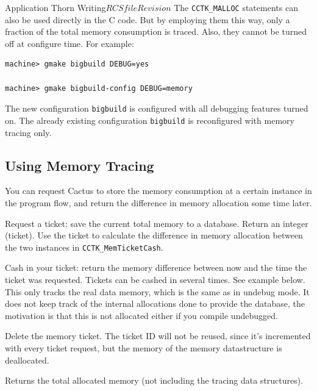 \begin{cactuspart}{Application Thorn Writing}{$RCSfile$}{$Revision$}
The \texttt{CCTK\_MALLOC} statements can also be used directly in the C
code. But by employing them this way, only a fraction of the total
memory consumption is traced. Also, they cannot be turned off at
configure time. For example:
\begin{verbatim}
machine> gmake bigbuild DEBUG=yes

machine> gmake bigbuild-config DEBUG=memory
\end{verbatim}
The new configuration \texttt{bigbuild} is configured with all debugging
features turned on. The already existing configuration \texttt{bigbuild}
is reconfigured with memory tracing only.

\subsection{Using Memory Tracing}
\label{sec:usmetr}

You can  request Cactus to store the memory consumption at a certain
instance in the program flow, and return the difference in memory
allocation some time later.

\begin{Lentry}
\item[\texttt{int CCTK\_MemTicketRequest(void)}]
        Request a ticket: save the current total memory to a database.
        Return an integer (ticket). Use the ticket to calculate the
        difference in memory allocation between the two instances in
        \texttt{CCTK\_MemTicketCash}.

\item[\texttt{long int CCTK\_MemTicketCash(int your\_ticket)}]
        Cash in your ticket: return the memory difference between now and the
        time the ticket was requested. Tickets can be cashed in
        several times. See example below.
        This only tracks the real data memory, which is the same as in
        undebug mode. It does not keep track of the internal allocations
        done to provide the database, the motivation is that this is not
        allocated either if you compile undebugged.

\item[\texttt{int CCTK\_MemTicketDelete(int your\_ticket)}]
        Delete the memory ticket. The ticket ID will not be reused, since
        it's incremented with every ticket request, but the memory of
        the memory datastructure is deallocated.

\item[\texttt{unsigned long int CCTK\_TotalMemory(void)}]
        Returns the total allocated memory (not including the tracing
        data structures).


\end{Lentry}
\end{cactuspart}
